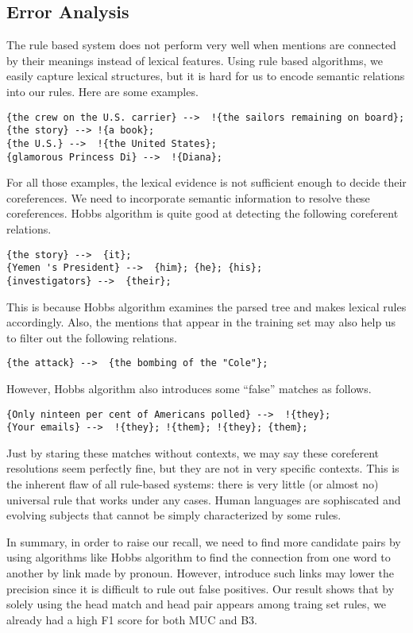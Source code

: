 \documentclass[letterpaper]{article}
\begin{document}
\subsection{Error Analysis}
The rule based system does not perform very well when mentions are connected by their meanings instead of lexical features. 
Using rule based algorithms, we easily capture lexical structures, but it is hard for us to encode semantic relations into our rules. 
Here are some examples.
\begin{verbatim}
{the crew on the U.S. carrier} -->  !{the sailors remaining on board};
{the story} --> !{a book};
{the U.S.} -->  !{the United States};
{glamorous Princess Di} -->  !{Diana};
\end{verbatim}
For all those examples, the lexical evidence is not sufficient enough to decide their coreferences. We need to incorporate semantic information to resolve these coreferences. Hobbs algorithm is quite good at detecting the following coreferent relations.
\begin{verbatim}
{the story} -->  {it};
{Yemen 's President} -->  {him}; {he}; {his};
{investigators} -->  {their};
\end{verbatim}
This is because Hobbs algorithm examines the parsed tree and makes lexical rules accordingly. Also, the mentions that appear in the training set may also help us to filter out the following relations.
\begin{verbatim}
{the attack} -->  {the bombing of the "Cole"};
\end{verbatim}
However, Hobbs algorithm also introduces some ``false'' matches as follows.
\begin{verbatim}
{Only ninteen per cent of Americans polled} -->  !{they};
{Your emails} -->  !{they}; !{them}; !{they}; {them};
\end{verbatim}
Just by staring these matches without contexts, we may say these coreferent resolutions seem perfectly fine, but they are not in very specific contexts.
This is the inherent flaw of all rule-based systems: there is very little (or almost no) universal rule that works under any cases. Human languages are sophiscated and evolving subjects that cannot be simply characterized by some rules.

\vspace{0.25cm}

In summary, in order to raise our recall, we need to find more candidate pairs by using algorithms like Hobbs algorithm to find the connection from one word to another by link made by pronoun. However, introduce such links may lower the precision since it is difficult to rule out false positives. Our result shows that by solely using the head match and head pair appears among traing set rules, we already had a high F1 score for both MUC and B3.
\end{document}
